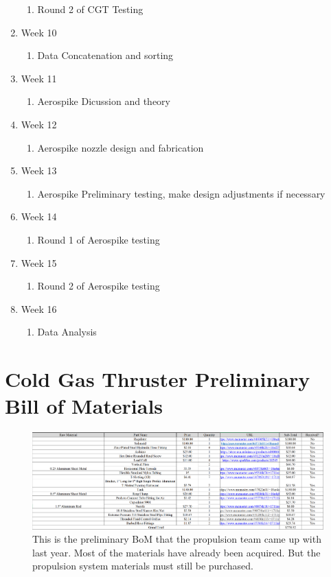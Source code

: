 \documentclass[conference]{IEEEtran} %
\begin{document}
\begin{enumerate}
  \begin{enumerate}
    \item Round 2 of CGT Testing
  \end{enumerate}
  \item Week 10
  \begin{enumerate}
    \item Data Concatenation and sorting
  \end{enumerate}
  \item Week 11
  \begin{enumerate}
    \item Aerospike Dicussion and theory
  \end{enumerate}
  \item Week 12
  \begin{enumerate}
    \item Aerospike nozzle design and fabrication
  \end{enumerate}
  \item Week 13
  \begin{enumerate}
    \item Aerospike Preliminary testing, make design adjustments if necessary
  \end{enumerate}
  \item Week 14
  \begin{enumerate}
    \item Round 1 of Aerospike testing
  \end{enumerate}
  \item Week 15
  \begin{enumerate}
    \item Round 2 of Aerospike testing
  \end{enumerate}
  \item Week 16
  \begin{enumerate}
    \item Data Analysis
  \end{enumerate}
\end{enumerate}

\newpage
\section{Cold Gas Thruster Preliminary Bill of Materials}

\begin{figure}[h]
  \includegraphics[width = \linewidth]{figs/CGT-BoM.png}
  \caption{This is the preliminary BoM that the propulsion team came up with last year. Most of the materials have already been acquired. But the propulsion system materials must still be purchased.}
\label{fig: CGT BoM}
\end{figure}
\end{document}
